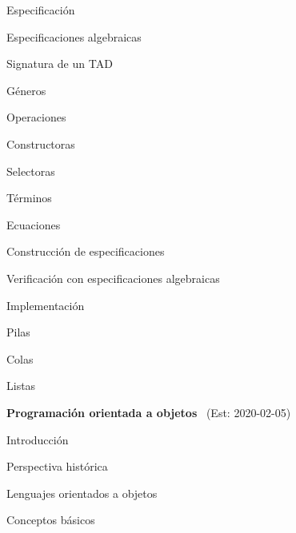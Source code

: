 \begin{longenum}
\begin{longenum}
\begin{longenum}
\begin{longenum}
            \end{longenum}
        \end{longenum}
        \item Especificación
        \begin{longenum}
            \item Especificaciones algebraicas
            \begin{longenum}
                \item Signatura de un TAD
                \begin{longenum}
                    \item Géneros
                    \item Operaciones
                    \begin{longenum}
                        \item Constructoras
                        \item Selectoras
                    \end{longenum}
                \end{longenum}
                \item Términos
                \item Ecuaciones
            \end{longenum}
            \item Construcción de especificaciones
            \item Verificación con especificaciones algebraicas
        \end{longenum}
        \item Implementación
        \begin{longenum}
            \item Pilas
            \item Colas
            \item Listas
        \end{longenum}
    \end{longenum}
    \item \textbf{Programación orientada a objetos} \ (Est: 2020-02-05)
    \begin{longenum}
        \item Introducción
        \begin{longenum}
            \item Perspectiva histórica
            \item Lenguajes orientados a objetos
        \end{longenum}
        \item Conceptos básicos

\end{longenum}
\end{longenum}
